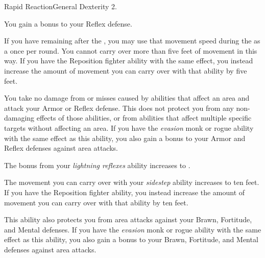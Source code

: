   \begin{feat}{Rapid Reaction}{General}
    \featpre Dexterity 2.

     You gain a  bonus to your Reflex defense.

     If you have  remaining after the , you may use that movement speed during the  as a  once per round.
    You cannot carry over more than five feet of movement in this way.
    If you have the Reposition fighter ability with the same effect, you instead increase the amount of movement you can carry over with that ability by five feet.

     You take no damage from  or misses caused by abilities that affect an area and attack your Armor or Reflex defense.
    This does not protect you from any non-damaging effects of those abilities, or from abilities that affect multiple specific targets without affecting an area.
    If you have the \textit{evasion} monk or rogue ability with the same effect as this ability, you also gain a  bonus to your Armor and Reflex defenses against area attacks.

     The bonus from your \textit{lightning reflexes} ability increases to .

     The movement you can carry over with your \textit{sidestep} ability increases to ten feet.
    If you have the Reposition fighter ability, you instead increase the amount of movement you can carry over with that ability by ten feet.

     This ability also protects you from area attacks against your Brawn, Fortitude, and Mental defenses.
    If you have the \textit{evasion\plus} monk or rogue ability with the same effect as this ability, you also gain a  bonus to your Brawn, Fortitude, and Mental defenses against area attacks.
  \end{feat}

